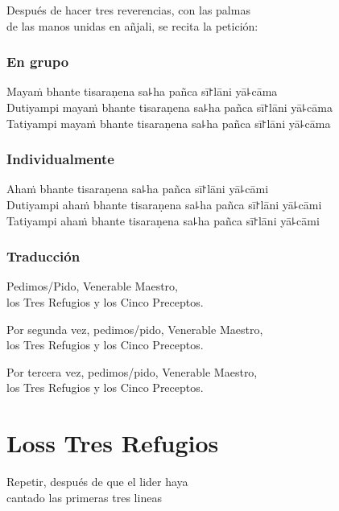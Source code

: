 \begin{instruction}
  Después de hacer tres reverencias, con las palmas\\
  de las manos unidas en añjali, se recita la petición:
\end{instruction}

\subsection{En grupo}

Mayaṁ bhante tisaraṇena sa꜕ha pañca sī꜓lāni yā꜕cāma\\
Dutiyampi mayaṁ bhante tisaraṇena sa꜕ha pañca sī꜓lāni yā꜕cāma\\
Tatiyampi mayaṁ bhante tisaraṇena sa꜕ha pañca sī꜓lāni yā꜕cāma

\subsection{Individualmente}

Ahaṁ bhante tisaraṇena sa꜕ha pañca sī꜓lāni yā꜕cāmi\\
Dutiyampi ahaṁ bhante tisaraṇena sa꜕ha pañca sī꜓lāni yā꜕cāmi\\
Tatiyampi ahaṁ bhante tisaraṇena sa꜕ha pañca sī꜓lāni yā꜕cāmi

\subsection{Traducción}

\begin{english}
  Pedimos/Pido, Venerable Maestro,\\
  \vin los Tres Refugios y los Cinco Preceptos.

  Por segunda vez, pedimos/pido, Venerable Maestro,\\
  \vin los Tres Refugios y los Cinco Preceptos.

  Por tercera vez, pedimos/pido, Venerable Maestro,\\
  \vin los Tres Refugios y los Cinco Preceptos.
\end{english}

\clearpage
\chapter{Loss Tres Refugios}

\begin{instruction}
  Repetir, después de que el lider haya\\
  cantado las primeras tres lineas
\end{instruction}

